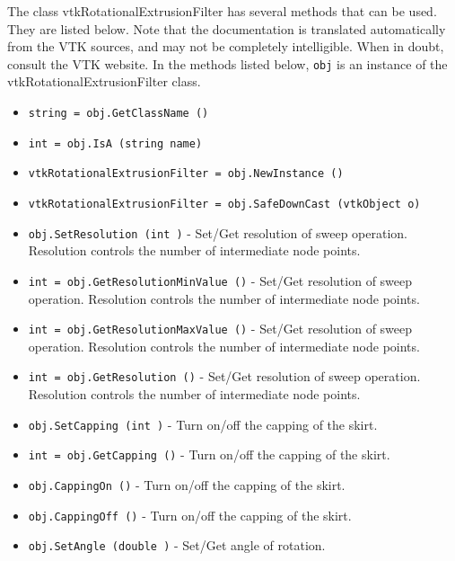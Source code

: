 The class vtkRotationalExtrusionFilter has several methods that can be used.
  They are listed below.
Note that the documentation is translated automatically from the VTK sources,
and may not be completely intelligible.  When in doubt, consult the VTK website.
In the methods listed below, \verb|obj| is an instance of the vtkRotationalExtrusionFilter class.
\begin{itemize}
\item  \verb|string = obj.GetClassName ()|

\item  \verb|int = obj.IsA (string name)|

\item  \verb|vtkRotationalExtrusionFilter = obj.NewInstance ()|

\item  \verb|vtkRotationalExtrusionFilter = obj.SafeDownCast (vtkObject o)|

\item  \verb|obj.SetResolution (int )| -  Set/Get resolution of sweep operation. Resolution controls the number
 of intermediate node points.

\item  \verb|int = obj.GetResolutionMinValue ()| -  Set/Get resolution of sweep operation. Resolution controls the number
 of intermediate node points.

\item  \verb|int = obj.GetResolutionMaxValue ()| -  Set/Get resolution of sweep operation. Resolution controls the number
 of intermediate node points.

\item  \verb|int = obj.GetResolution ()| -  Set/Get resolution of sweep operation. Resolution controls the number
 of intermediate node points.

\item  \verb|obj.SetCapping (int )| -  Turn on/off the capping of the skirt.

\item  \verb|int = obj.GetCapping ()| -  Turn on/off the capping of the skirt.

\item  \verb|obj.CappingOn ()| -  Turn on/off the capping of the skirt.

\item  \verb|obj.CappingOff ()| -  Turn on/off the capping of the skirt.

\item  \verb|obj.SetAngle (double )| -  Set/Get angle of rotation.


\end{itemize}
